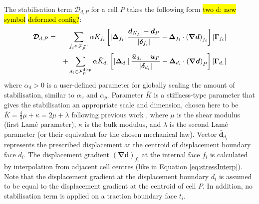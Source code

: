 \documentclass[sn-mathphys,Numbered]{sn-jnl}%
\newcommand{\bb}{\boldsymbol}
\begin{document}
The stabilisation term  $\bb{\mathcal{D}}_{d,P}$ for a cell $P$ takes the following form \hl{two d: new symbol} \hl{deformed config?}:
\begin{eqnarray} \label{eq:RhieChow}
	\bb{\mathcal{D}}_{d,P}
	&=& \sum_{f_i \in \mathcal{F}^{\text{int}}_P} \alpha \bar{K}_{f_i} \left[
		\left|\bb{\Delta}_{f_i} \right| \frac{ \bb{d}_{N_{f_i}} - \bb{d}_P}{\left|\bb{\delta}_{f_i}\right|}	- \bb{\Delta}_{f_i} \cdot \left(\bb{\nabla} \bb{d} \right)_{f_i}
		\right]    \left|\bb{\Gamma}_{f_i}\right| \notag \\
	&&+ \sum_{d_i \in \mathcal{F}^{\text{disp}}_P} \alpha \bar{K}_{d_i} \left[
		\left|\bb{\Delta}_{d_i} \right| \frac{ \bar{\bb{u}}_{d_i} - \bb{u}_P}{\left|\bb{\delta}_{d_i}\right|}	- \bb{\Delta}_{d_i} \cdot \left(\bb{\nabla} \bb{d} \right)_{P}
		\right]    \left|\bb{\Gamma}_{d_i}\right| %
\end{eqnarray}
where $\alpha_d > 0$ is a user-defined parameter for globally scaling the amount of stabilisation, similar to $\alpha_v$ and $\alpha_p$.
Parameter $\bar{K}$ is a stiffness-type parameter that gives the stabilisation an appropriate scale and dimension, chosen here to be $\bar{K} = \frac{4}{3}\mu + \kappa = 2\mu + \lambda$ following previous work \cite{Jasak2000, Cardiff2017, Cardiff2018}, where $\mu$ is the shear modulus (first Lam\'{e} parameter), $\kappa$ is the bulk modulus, and $\lambda$ is the second Lam\'{e} parameter (or their equivalent for the chosen mechanical law).
Vector $\bar{\bb{d}}_{d_i}$ represents the prescribed displacement at the centroid of displacement boundary face $d_i$.
The displacement gradient $\left(\bb{\nabla} \bb{d} \right)_{f_i}$ at the internal face $f_i$ is calculated by interpolation from adjacent cell centres (like in Equation \ref{eq:stressInterp}).
Note that the displacement gradient at the displacement boundary $d_i$ is assumed to be equal to the displacement gradient at the centroid of cell $P$.
In addition, no stabilisation term is applied on a traction boundary face $t_i$.
\end{document}
